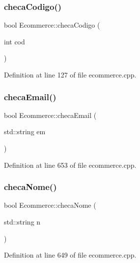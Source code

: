 \subsubsection{\texorpdfstring{checa\+Codigo()}{checaCodigo()}}
{\footnotesize\ttfamily bool Ecommerce\+::checa\+Codigo (\begin{DoxyParamCaption}\item[{int}]{cod }\end{DoxyParamCaption})}



Definition at line 127 of file ecommerce.\+cpp.

\mbox{\label{class_ecommerce_aefd675a09f348e798fc379f09d265756}} 
\subsubsection{\texorpdfstring{checa\+Email()}{checaEmail()}}
{\footnotesize\ttfamily bool Ecommerce\+::checa\+Email (\begin{DoxyParamCaption}\item[{std\+::string}]{em }\end{DoxyParamCaption})}



Definition at line 653 of file ecommerce.\+cpp.

\mbox{\label{class_ecommerce_aca3eed60042bb02ac3d3cacb20b86c8d}} 
\subsubsection{\texorpdfstring{checa\+Nome()}{checaNome()}}
{\footnotesize\ttfamily bool Ecommerce\+::checa\+Nome (\begin{DoxyParamCaption}\item[{std\+::string}]{n }\end{DoxyParamCaption})}



Definition at line 649 of file ecommerce.\+cpp.

\mbox{\label{class_ecommerce_ac0d4a423c9e3699dcb6f6783b32bdcbd}} 
